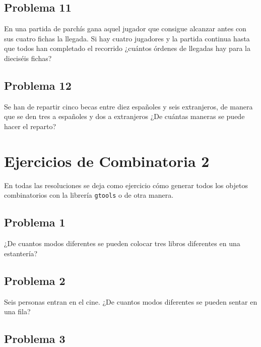 \documentclass[
]{article}
\begin{document}
\hypertarget{problema-11}{%
\subsection{Problema 11}\label{problema-11}}

En una partida de parchís gana aquel jugador que consigue alcanzar antes
con sus cuatro fichas la llegada. Si hay cuatro jugadores y la partida
continua hasta que todos han completado el recorrido ¿cuántos órdenes de
llegadas hay para la dieciséis fichas?

\hypertarget{problema-12}{%
\subsection{Problema 12}\label{problema-12}}

Se han de repartir cinco becas entre diez españoles y seis extranjeros,
de manera que se den tres a españoles y dos a extranjeros ¿De cuántas
maneras se puede hacer el reparto?

\newpage

\hypertarget{ejercicios-de-combinatoria-2}{%
\section{Ejercicios de Combinatoria
2}\label{ejercicios-de-combinatoria-2}}

En todas las resoluciones se deja como ejercicio cómo generar todos los
objetos combinatorios con la librería \texttt{gtools} o de otra manera.

\hypertarget{problema-1}{%
\subsection{Problema 1}\label{problema-1}}

¿De cuantos modos diferentes se pueden colocar tres libros diferentes en
una estantería?

\hypertarget{problema-2-1}{%
\subsection{Problema 2}\label{problema-2-1}}

Seis personas entran en el cine. ¿De cuantos modos diferentes se pueden
sentar en una fila?

\hypertarget{problema-3}{%
\subsection{Problema 3}\label{problema-3}}
\end{document}
